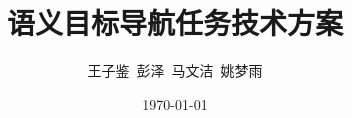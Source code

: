 \documentclass[xcolor=dvipsnames]{beamer}
\title{语义目标导航任务技术方案}
\author{王子鉴~彭泽~马文洁~姚梦雨}
\date{\today}
\begin{document}
\begin{frame}
  \maketitle
\end{frame}









%

\begin{frame}
  \printbibliography
\end{frame}
\end{document}
